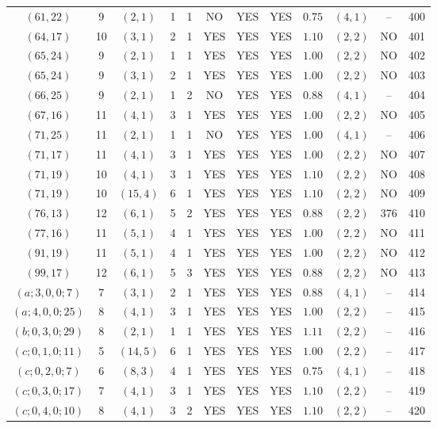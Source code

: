 \begin{longtable}{|c|c|c|c|c|c|c|c|c|c|c|c|}
$(61,22)$ & 9 & $(2,1)$ & 1 & 1 & NO & YES & YES & $0.75$ & $(4,1)$ & -- & 400\\
$(64,17)$ & 10 & $(3,1)$ & 2 & 1 & YES & YES & YES & $1.10$ & $(2,2)$ & NO & 401\\
$(65,24)$ & 9 & $(2,1)$ & 1 & 1 & YES & YES & YES & $1.00$ & $(2,2)$ & NO & 402\\
$(65,24)$ & 9 & $(3,1)$ & 2 & 1 & YES & YES & YES & $1.00$ & $(2,2)$ & NO & 403\\
$(66,25)$ & 9 & $(2,1)$ & 1 & 2 & NO & YES & YES & $0.88$ & $(4,1)$ & -- & 404\\
$(67,16)$ & 11 & $(4,1)$ & 3 & 1 & YES & YES & YES & $1.00$ & $(2,2)$ & NO & 405\\
$(71,25)$ & 11 & $(2,1)$ & 1 & 1 & NO & YES & YES & $1.00$ & $(4,1)$ & -- & 406\\
$(71,17)$ & 11 & $(4,1)$ & 3 & 1 & YES & YES & YES & $1.00$ & $(2,2)$ & NO & 407\\
$(71,19)$ & 10 & $(4,1)$ & 3 & 1 & YES & YES & YES & $1.10$ & $(2,2)$ & NO & 408\\
$(71,19)$ & 10 & $(15,4)$ & 6 & 1 & YES & YES & YES & $1.10$ & $(2,2)$ & NO & 409\\
$(76,13)$ & 12 & $(6,1)$ & 5 & 2 & YES & YES & YES & $0.88$ & $(2,2)$ & 376 & 410\\
$(77,16)$ & 11 & $(5,1)$ & 4 & 1 & YES & YES & YES & $1.00$ & $(2,2)$ & NO & 411\\
$(91,19)$ & 11 & $(5,1)$ & 4 & 1 & YES & YES & YES & $1.00$ & $(2,2)$ & NO & 412\\
$(99,17)$ & 12 & $(6,1)$ & 5 & 3 & YES & YES & YES & $0.88$ & $(2,2)$ & NO & 413\\
$(a;3,0,0;7)$ & 7 & $(3,1)$ & 2 & 1 & YES & YES & YES & $0.88$ & $(4,1)$ & -- & 414\\
$(a;4,0,0;25)$ & 8 & $(4,1)$ & 3 & 1 & YES & YES & YES & $1.00$ & $(2,2)$ & -- & 415\\
$(b;0,3,0;29)$ & 8 & $(2,1)$ & 1 & 1 & YES & YES & YES & $1.11$ & $(2,2)$ & -- & 416\\
$(c;0,1,0;11)$ & 5 & $(14,5)$ & 6 & 1 & YES & YES & YES & $1.00$ & $(2,2)$ & -- & 417\\
$(c;0,2,0;7)$ & 6 & $(8,3)$ & 4 & 1 & YES & YES & YES & $0.75$ & $(4,1)$ & -- & 418\\
$(c;0,3,0;17)$ & 7 & $(4,1)$ & 3 & 1 & YES & YES & YES & $1.10$ & $(2,2)$ & -- & 419\\
$(c;0,4,0;10)$ & 8 & $(4,1)$ & 3 & 2 & YES & YES & YES & $1.10$ & $(2,2)$ & -- & 420\\

\end{longtable}
